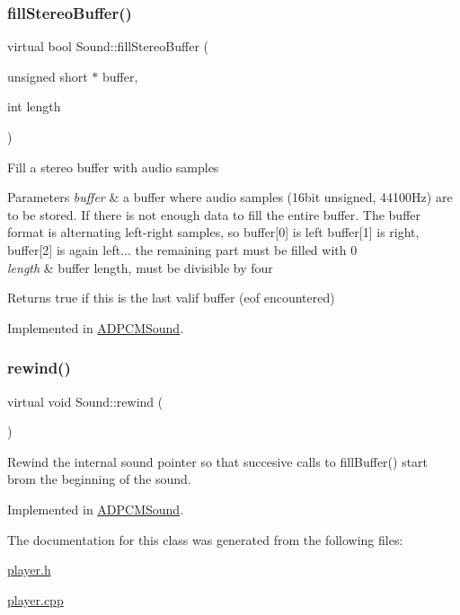 \subsubsection{\texorpdfstring{fill\+Stereo\+Buffer()}{fillStereoBuffer()}}
{\footnotesize\ttfamily virtual bool Sound\+::fill\+Stereo\+Buffer (\begin{DoxyParamCaption}\item[{unsigned short $\ast$}]{buffer,  }\item[{int}]{length }\end{DoxyParamCaption})\hspace{0.3cm}{\ttfamily [pure virtual]}}

Fill a stereo buffer with audio samples 
\begin{DoxyParams}{Parameters}
{\em buffer} & a buffer where audio samples (16bit unsigned, 44100\+Hz) are to be stored. If there is not enough data to fill the entire buffer. The buffer format is alternating left-\/right samples, so buffer\mbox{[}0\mbox{]} is left buffer\mbox{[}1\mbox{]} is right, buffer\mbox{[}2\mbox{]} is again left... the remaining part must be filled with 0 \\
\hline
{\em length} & buffer length, must be divisible by four \\
\hline
\end{DoxyParams}
\begin{DoxyReturn}{Returns}
true if this is the last valif buffer (eof encountered) 
\end{DoxyReturn}


Implemented in \hyperlink{class_a_d_p_c_m_sound_a04e36f00fa43f9da21bc4bd97a2ddf44}{A\+D\+P\+C\+M\+Sound}.

\mbox{\label{class_sound_a1870e3d50f0f58fc98fd966372ce42f1}} 
\subsubsection{\texorpdfstring{rewind()}{rewind()}}
{\footnotesize\ttfamily virtual void Sound\+::rewind (\begin{DoxyParamCaption}{ }\end{DoxyParamCaption})\hspace{0.3cm}{\ttfamily [pure virtual]}}

Rewind the internal sound pointer so that succesive calls to fill\+Buffer() start brom the beginning of the sound. 

Implemented in \hyperlink{class_a_d_p_c_m_sound_ac1c8d4b362dd7803087f82f3b26f6957}{A\+D\+P\+C\+M\+Sound}.



The documentation for this class was generated from the following files\+:\begin{DoxyCompactItemize}
\item 
\hyperlink{player_8h}{player.\+h}\item 
\hyperlink{player_8cpp}{player.\+cpp}\end{DoxyCompactItemize}
